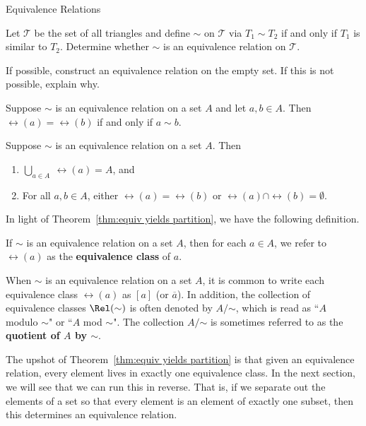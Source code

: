 \begin{section}{Equivalence Relations}
\begin{problem}
Let $\mathcal{T}$ be the set of all triangles and define $\sim$ on $\mathcal{T}$ via $T_1\sim T_2$ if and only if $T_1$ is similar to $T_2$.  Determine whether $\sim$ is an equivalence relation on $\mathcal{T}$.
\end{problem}

\begin{problem}
If possible, construct an equivalence relation on the empty set.  If this is not possible, explain why.
\end{problem}

\begin{theorem}\label{thm:related if and only if same class}
Suppose $\sim$ is an equivalence relation on a set $A$ and let $a,b\in A$.  Then $\rel(a)=\rel(b)$ if and only if $a\sim b$.
\end{theorem}

\begin{theorem}\label{thm:equiv yields partition}
Suppose $\sim$ is an equivalence relation on a set $A$.  Then
\begin{enumerate}[label=\textrm{(\alph*)}]
\item $\displaystyle \bigcup_{a\in A}\ \rel(a)=A$, and
\item For all $a,b\in A$, either $\rel(a)=\rel(b)$ or $\rel(a)\cap \rel(b)=\emptyset$.
\end{enumerate}
\end{theorem}

In light of Theorem~\ref{thm:equiv yields partition}, we have the following definition.

\begin{definition}\label{def:equivalence class}
If $\sim$ is an equivalence relation on a set $A$, then for each $a\in A$, we refer to $\rel(a)$ as the \textbf{equivalence class} of $a$.
\end{definition}

When $\sim$ is an equivalence relation on a set $A$, it is common to write each equivalence class $\rel(a)$ as $[a]$ (or $\overline{a}$). In addition, the collection of equivalence classes $\Rel(\sim)$ is often denoted by $A/\mathord\sim$, which is read as ``$A$ modulo $\sim$" or ``$A$ mod $\sim$".  The collection $A/\mathord\sim$ is sometimes referred to as the \textbf{quotient of $A$ by $\sim$}.

The upshot of Theorem~\ref{thm:equiv yields partition} is that given an equivalence relation, every element lives in exactly one equivalence class.  In the next section, we will see that we can run this in reverse.  That is, if we separate out the elements of a set so that every element is an element of exactly one subset, then this determines an equivalence relation.


\end{section}
